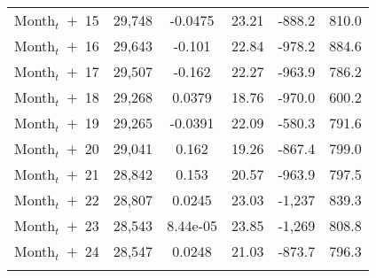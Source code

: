 \begin{table}[H]
\begin{center}
\begin{tabular}{lccccc}
Month$_t$\ $+$\ 15 & 29,748 & -0.0475 & 23.21 & -888.2 & 810.0 \\
Month$_t$\ $+$\ 16 & 29,643 & -0.101 & 22.84 & -978.2 & 884.6 \\
Month$_t$\ $+$\ 17 & 29,507 & -0.162 & 22.27 & -963.9 & 786.2 \\
Month$_t$\ $+$\ 18 & 29,268 & 0.0379 & 18.76 & -970.0 & 600.2 \\
Month$_t$\ $+$\ 19 & 29,265 & -0.0391 & 22.09 & -580.3 & 791.6 \\
Month$_t$\ $+$\ 20 & 29,041 & 0.162 & 19.26 & -867.4 & 799.0 \\
Month$_t$\ $+$\ 21 & 28,842 & 0.153 & 20.57 & -963.9 & 797.5 \\
Month$_t$\ $+$\ 22 & 28,807 & 0.0245 & 23.03 & -1,237 & 839.3 \\
Month$_t$\ $+$\ 23 & 28,543 & 8.44e-05 & 23.85 & -1,269 & 808.8 \\
Month$_t$\ $+$\ 24& 28,547 & 0.0248 & 21.03 & -873.7 & 796.3 \\
 & \begin{footnotesize}\end{footnotesize} & \begin{footnotesize}\end{footnotesize} & \begin{footnotesize}\end{footnotesize} & \begin{footnotesize}\end{footnotesize} & \begin{footnotesize}\end{footnotesize} \\ \hline
\end{tabular}
\end{center}
\end{table}







 




 

 

 
 



 
 
 
 
 
